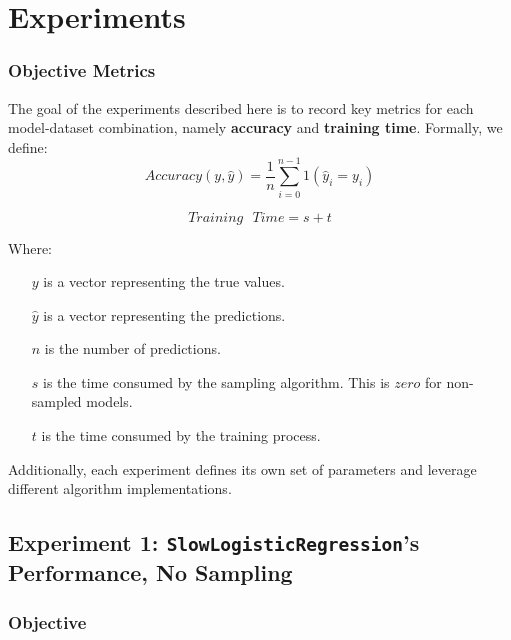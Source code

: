 \documentclass{article}
\theoremstyle{plain}
\theoremstyle{definition}
\theoremstyle{remark}
\begin{document}
\newpage
\appendix
\twocolumn
\section{Experiments}

\subsubsection{Objective Metrics}

The goal of the experiments described here is to record key metrics for each model-dataset combination, namely \textbf{accuracy} and \textbf{training time}. Formally, we define:
$$
Accuracy(y, \hat{y}) = \frac{1}{n} \sum_{i=0}^{n-1} 1(\hat{y}_i = y_i)
$$

$$
Training\text{ }Time = s + t
$$

Where:

\begin{itemize}

\item[$y$] is a vector representing the true values.
\item[$\hat{y}$] is a vector representing the predictions.
\item[$n$] is the number of predictions.
\item[$s$] is the time consumed by the sampling algorithm. This is $zero$ for non-sampled models.
\item[$t$] is the time consumed by the training process.

\end{itemize}

Additionally, each experiment defines its own set of parameters and leverage different algorithm implementations.

\subsection{Experiment 1: \texttt{SlowLogisticRegression}'s Performance, No Sampling}


\subsubsection{Objective}
\end{document}

